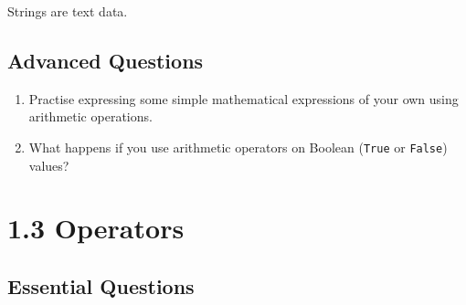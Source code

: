 \documentclass[12pt]{article}
\begin{document}
\begin{Exercise}[title=Strings] \label{Ex:Strings}

Strings are text data. 



		
		
		
		
		
		



\end{Exercise}

\subsection*{Advanced Questions}

\begin{enumerate}[label=(\Alph*)]
    \item Practise expressing some simple mathematical expressions of your own using arithmetic operations. 
    \item What happens if you use arithmetic operators on Boolean ({\tt True} or {\tt False}) values?
\end{enumerate}

	

\section*{1.3 Operators}

\subsection*{Essential Questions}
\end{document}
